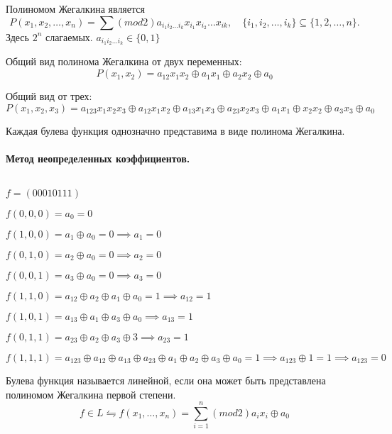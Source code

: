 \begin{definition}
Полиномом Жегалкина является
\[
P(x_1,x_2,\ldots,x_{n}) = \sum\limits (mod 2) a_{i_1i_2\ldots i_k}x_{i_1}x_{i_2}\ldots x_{ik},
\quad \{i_1,i_2,\ldots,i_k\} \subseteq \{1,2,\ldots,n\}  
.\] Здесь $2^{n}$ слагаемых. $a_{i_1i_2\ldots i_k} \in \{0,1\}$ 
\end{definition}

Общий вид полинома Жегалкина от двух переменных:
\[
P(x_1,x_2) = a_{12}x_1x_2 \oplus a_1x_1 \oplus a_2x_2 \oplus a_0
\]

Общий вид от трех:
\[
P(x_1,x_2,x_3) = a_{123}x_1x_2x_3 \oplus a_{12}x_1x_2 \oplus a_{13}x_1x_3 \oplus a_{23}x_2x_3 \oplus
a_1x_1 \oplus x_2x_2 \oplus a_3x_3 \oplus a_0
\] 

\begin{theorem}
Каждая булева функция однозначно представима в виде полинома Жегалкина.
\end{theorem}

\paragraph*{Метод неопределенных коэффициентов.} ${}$ \newline

$f = (00010111)$

$f(0,0,0) = a_0 = 0$

$f(1,0,0) = a_1\oplus a_0 = 0 \implies a_1 = 0$

$f(0,1,0) = a_2 \oplus a_0 = 0 \implies a_2 = 0$

$f(0,0,1) = a_3 \oplus a_0 = 0 \implies a_3 = 0$

$f(1,1,0) = a_{12} \oplus a_2 \oplus a_1 \oplus a_0 = 1 \implies a_{12} = 1$

$f(1,0,1) = a_{13} \oplus a_1 \oplus a_3 \oplus a_0 \implies a_{13} = 1$

$f(0,1,1) = a_{23} \oplus a_2 \oplus a_3 \oplus 3 \implies a_{23} = 1$

$f(1,1,1) = a_{123} \oplus a_{12} \oplus a_{13} \oplus a_{23} \oplus a_1 \oplus a_2 \oplus a_3
\oplus a_0 = 1 \implies a_{123} \oplus 1 = 1 \implies a_{123} = 0$

\begin{definition}
Булева функция называется линейной, если она может быть представлена полиномом Жегалкина
первой степени.
\[
f \in L \leftrightharpoons f(x_1,\ldots,x_{n}) = \sum\limits_{i=1}^{n}(mod2)a_{i}x_{i}\oplus a_0
\] 
\end{definition}


